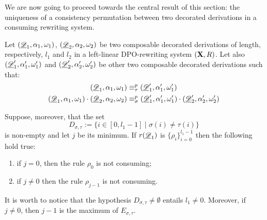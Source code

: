 We are now going to proceed towards the central result of this section: the uniqueness of a consistency permutation between two decorated derivations in a consuming rewriting system.
 
\begin{lemma}\label{lem:impo}
Let  $(\underline{\mathscr{D}}_1, \alpha_1, \omega_1)$, $(\underline{\mathscr{D}}_2, \alpha_2, \omega_2)$ be two composable decorated derivations of length, respectively, $l_1$ and $l_2$  in a left-linear DPO-rewriting system $(\textbf {\textup{X}},R)$. Let also  $(\underline{\mathscr{D}}'_1, \alpha'_1, \omega'_1)$ and $(\underline{\mathscr{D}}'_2, \alpha'_2, \omega'_2)$ be other two composable decorated derivations such that:
	\begin{align*}(\underline{\mathscr{D}}_1, \alpha_1, \omega_1)&\equiv^p_\tau(\underline{\mathscr{D}}'_1, \alpha'_1, \omega'_1)\\
	(\underline{\mathscr{D}}_1, \alpha_1, \omega_1)\cdot (\underline{\mathscr{D}}_2, \alpha_2, \omega_2)&\equiv^p_\sigma (\underline{\mathscr{D}}'_1, \alpha'_1, \omega'_1)\cdot (\underline{\mathscr{D}}'_2, \alpha'_2, \omega'_2)
	\end{align*}
	
Suppose, moreover, that the set
	\[D_{\sigma, \tau}:=\{i\in [0, l_1-1]\mid \sigma(i)\neq \tau(i)\}\]
	is non-empty and let $j$ be its minimum. If $r(\underline{\mathscr{D}}_1)$ is $\{\rho_i\}_{i=0}^{l_1-1}$ then the following hold true:
	\begin{enumerate}
		\item if $j=0$, then the rule $\rho_0$ is not consuming;
		\item if $j\neq 0$ then the rule $\rho_{j-1}$ is not consuming.
	\end{enumerate}
\end{lemma}
\begin{remark}\label{rem:minmax}It is worth to notice that the hypothesis $D_{\sigma, \tau} \neq \emptyset$ entails $l_1\neq 0$. Moreover, if $j\neq 0$, then $j-1$ is the maximum of $E_{\sigma, \tau}$.
\end{remark}

